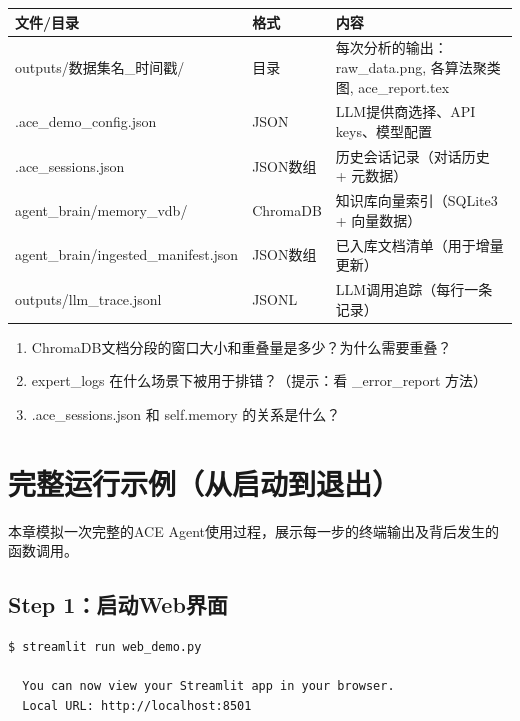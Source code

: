 \documentclass[11pt,a4paper]{ctexbook}
\begin{document}
\begin{longtable}{p{3.5cm} p{3cm} p{6.5cm}}
    \toprule
    \textbf{文件/目录} & \textbf{格式} & \textbf{内容} \\
    \midrule
    outputs/数据集名\_时间戳/ & 目录 & 每次分析的输出：raw\_data.png, 各算法聚类图, ace\_report.tex \\
    \midrule
    .ace\_demo\_config.json & JSON & LLM提供商选择、API keys、模型配置 \\
    \midrule
    .ace\_sessions.json & JSON数组 & 历史会话记录（对话历史 + 元数据） \\
    \midrule
    agent\_brain/memory\_vdb/ & ChromaDB & 知识库向量索引（SQLite3 + 向量数据） \\
    \midrule
    agent\_brain/ingested\_manifest.json & JSON数组 & 已入库文档清单（用于增量更新） \\
    \midrule
    outputs/llm\_trace.jsonl & JSONL & LLM调用追踪（每行一条记录） \\
    \bottomrule
\end{longtable}

\begin{reviewbox}
    \begin{enumerate}
        \item ChromaDB文档分段的窗口大小和重叠量是多少？为什么需要重叠？
        \item expert\_logs 在什么场景下被用于排错？（提示：看 \_error\_report 方法）
        \item .ace\_sessions.json 和 self.memory 的关系是什么？
    \end{enumerate}
\end{reviewbox}

\chapter{完整运行示例（从启动到退出）}

本章模拟一次完整的ACE Agent使用过程，展示每一步的终端输出及背后发生的函数调用。

\section{Step 1：启动Web界面}

\begin{verbatim}
$ streamlit run web_demo.py

  You can now view your Streamlit app in your browser.
  Local URL: http://localhost:8501
\end{verbatim}
\end{document}
